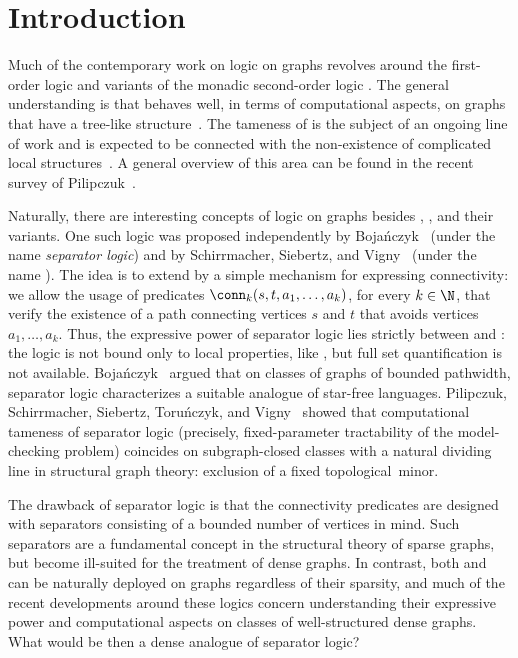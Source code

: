 \section{Introduction}\label{sec:intro}

Much of the contemporary work on logic on graphs revolves around the first-order logic \fo and variants of the monadic second-order logic \mso. The general understanding is that \mso behaves well, in terms of computational aspects, on graphs that have a tree-like structure~\cite{courcelleMonadicSecondorderLogic1990,courcelle2000linear}.
The tameness of \fo is the subject of an ongoing line of work and is expected to be connected with the non-existence of complicated local structures~\cite{DreierEMMPT24,DreierMST23,DreierMT24,flippergame,Torunczyk23}. A general overview of this area can be found in the recent survey of Pilipczuk~\cite{Pilipczuk25}.

Naturally, there are interesting concepts of logic on graphs besides \fo, \mso, and their variants. One such logic was proposed independently by Boja\'nczyk~\cite{separator-logic2021} (under the name {\em{separator logic}}) and by Schirrmacher, Siebertz, and Vigny~\cite{schirrmacher2023first} (under the name \foconn). The idea is to extend \fo by a simple mechanism for expressing connectivity: we allow the usage of predicates $\conn_k(s,t,a_1,\ldots,a_k)$, for every $k\in \N$, that verify the existence of a path connecting vertices $s$ and $t$ that avoids vertices $a_1,\ldots,a_k$. Thus, the expressive power of separator logic lies strictly between \fo and \mso: the logic is not bound only to local properties, like \fo, but full set quantification is not available. Boja\'nczyk~\cite{separator-logic2021} argued that on classes of graphs of bounded pathwidth, separator logic characterizes a suitable analogue of star-free languages.
Pilipczuk, Schirrmacher, Siebertz, Toru\'nczyk, and Vigny~\cite{separatorModelChecking} showed that computational tameness of separator logic (precisely, fixed-parameter tractability of the model-checking problem) coincides on subgraph-closed classes with a natural dividing line in structural graph theory: exclusion of a fixed topological~minor.

The drawback of separator logic is that the connectivity predicates are designed with separators consisting of a bounded number of vertices in mind. Such separators are a fundamental concept in the structural theory of sparse graphs, but become ill-suited for the treatment of dense graphs. In contrast, both \fo and \mso can be naturally deployed on graphs regardless of their sparsity, and much of the recent developments around these logics concern understanding their expressive power and computational aspects on classes of well-structured dense graphs. What would be then a dense analogue of separator logic?

